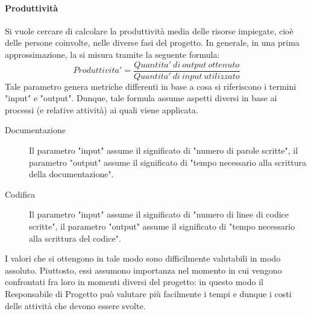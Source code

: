 				\paragraph{Produttività}
					Si vuole cercare di calcolare la produttività media delle risorse impiegate, cioè delle persone coinvolte, nelle diverse fasi del 
					progetto. In generale, in una prima approssimazione, la si misura tramite la seguente formula:
					\begin{equation}
						Produttivita' = \frac{Quantita'\ di\ output\ ottenuto}{Quantita'\ di\ input\ utilizzato}
						\label{Produttività}
					\end{equation}
					Tale parametro genera metriche differenti in base a cosa si riferiscono i termini "input" e "output". Dunque, tale formula assume 
					aspetti diversi in base ai processi (e relative attività) ai quali viene applicata.
					\begin{description}
						\item[Documentazione] Il parametro "input" assume il significato di "numero di parole scritte", il parametro "output" assume il 
						significato di "tempo necessario alla scrittura della documentazione".
						\item[Codifica] Il parametro "input" assume il significato di "numero di linee di codice scritte", il parametro "output" assume 
						il significato di "tempo necessario alla scrittura del codice".
					\end{description}
					I valori che si ottengono in tale modo sono difficilmente valutabili in modo assoluto. Piuttosto, essi assumono importanza nel 
					momento in cui vengono confrontati fra loro in momenti diversi del progetto: in questo modo il Responsabile di Progetto può valutare 
					più facilmente i tempi e dunque i costi delle attività che devono essere svolte.
